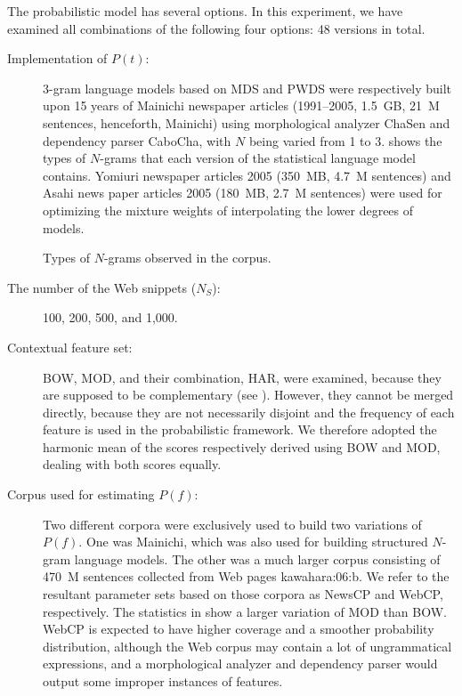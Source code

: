 \documentclass[english]{jnlp_1.4}
\renewcommand{\cite}{}
\begin{document}
The probabilistic model has several options.  In this experiment, we
have examined all combinations of the following four options: 48
versions in total.
\begin{description}
\item[Implementation of $P(t)$:] 3-gram language models based on MDS
  and PWDS were respectively built upon 15 years of Mainichi newspaper
  articles (1991--2005, 1.5~GB, 21~M sentences, henceforth, Mainichi)
  using morphological analyzer ChaSen and dependency parser CaboCha,
  with $N$ being varied from 1 to 3.   shows the types of
  $N$-grams that each version of the statistical language model
  contains.  Yomiuri newspaper articles 2005 (350~MB, 4.7~M sentences)
  and Asahi news paper articles 2005 (180~MB, 2.7~M sentences) were used
  for optimizing the mixture weights of interpolating the lower
  degrees of models.

\begin{table}[t]
\caption{Types of $N$-grams observed in the corpus.}
\label{tab:slm}

\end{table}

\item[The number of the Web snippets ($N_{S}$):] 100, 200, 500, and
  1,000.

\item[Contextual feature set:] BOW, MOD, and their combination, HAR,
  were examined, because they are supposed to be complementary (see
  ).  However, they cannot be merged directly,
  because they are not necessarily disjoint and the frequency of each
  feature is used in the probabilistic framework.  We therefore
  adopted the harmonic mean of the scores respectively derived using
  BOW and MOD, dealing with both scores equally.

\item[Corpus used for estimating $P(f)$:] Two different corpora were
  exclusively used to build two variations of $P(f)$.  One was
  Mainichi, which was also used for building structured $N$-gram
  language models.  The other was a much larger corpus consisting of
  470~M sentences collected from Web pages \cite{kawahara:06:b}.  We
  refer to the resultant parameter sets based on those corpora as
  NewsCP and WebCP, respectively.  The statistics in 
  show a larger variation of MOD than BOW.  WebCP is expected to have
  higher coverage and a smoother probability distribution, although
  the Web corpus may contain a lot of ungrammatical expressions, and a
  morphological analyzer and dependency parser would output some
  improper instances of features.

\end{description}
\end{document}
